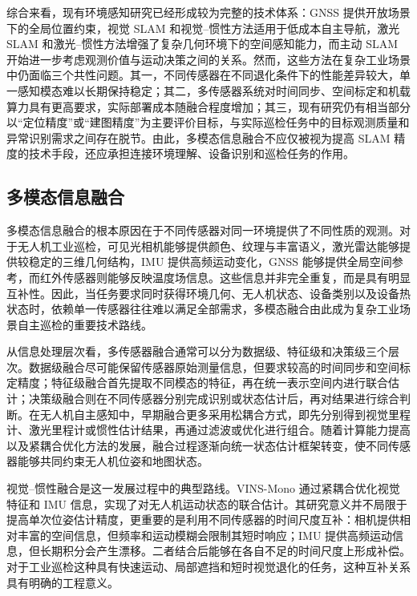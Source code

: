 综合来看，现有环境感知研究已经形成较为完整的技术体系：GNSS 提供开放场景下的全局位置约束，视觉 SLAM 和视觉--惯性方法适用于低成本自主导航，激光 SLAM 和激光--惯性方法增强了复杂几何环境下的空间感知能力，而主动 SLAM 开始进一步考虑观测价值与运动决策之间的关系。然而，这些方法在复杂工业场景中仍面临三个共性问题。其一，不同传感器在不同退化条件下的性能差异较大，单一感知模态难以长期保持稳定；其二，多传感器系统对时间同步、空间标定和机载算力具有更高要求，实际部署成本随融合程度增加；其三，现有研究仍有相当部分以“定位精度”或“建图精度”为主要评价目标，与实际巡检任务中的目标观测质量和异常识别需求之间存在脱节。由此，多模态信息融合不应仅被视为提高 SLAM 精度的技术手段，还应承担连接环境理解、设备识别和巡检任务的作用。

\subsection{多模态信息融合}

多模态信息融合的根本原因在于不同传感器对同一环境提供了不同性质的观测。对于无人机工业巡检，可见光相机能够提供颜色、纹理与丰富语义，激光雷达能够提供较稳定的三维几何结构，IMU 提供高频运动变化，GNSS 能够提供全局空间参考，而红外传感器则能够反映温度场信息\cite{jadin2012recent,usamentiaga2014infrared,wujq2021review}。这些信息并非完全重复，而是具有明显互补性。因此，当任务要求同时获得环境几何、无人机状态、设备类别以及设备热状态时，依赖单一传感器往往难以满足全部需求，多模态融合由此成为复杂工业场景自主巡检的重要技术路线。

从信息处理层次看，多传感器融合通常可以分为数据级、特征级和决策级三个层次。数据级融合尽可能保留传感器原始测量信息，但要求较高的时间同步和空间标定精度；特征级融合首先提取不同模态的特征，再在统一表示空间内进行联合估计；决策级融合则在不同传感器分别完成识别或状态估计后，再对结果进行综合判断\cite{panq2003basic,wangj2004survey,hey2000multi}。在无人机自主感知中，早期融合更多采用松耦合方式，即先分别得到视觉里程计、激光里程计或惯性估计结果，再通过滤波或优化进行组合。随着计算能力提高以及紧耦合优化方法的发展，融合过程逐渐向统一状态估计框架转变，使不同传感器能够共同约束无人机位姿和地图状态。

视觉--惯性融合是这一发展过程中的典型路线。VINS-Mono 通过紧耦合优化视觉特征和 IMU 信息，实现了对无人机运动状态的联合估计\cite{qin2018vins}。其研究意义并不局限于提高单次位姿估计精度，更重要的是利用不同传感器的时间尺度互补：相机提供相对丰富的空间信息，但频率和运动模糊会限制其短时响应；IMU 提供高频运动信息，但长期积分会产生漂移。二者结合后能够在各自不足的时间尺度上形成补偿。对于工业巡检这种具有快速运动、局部遮挡和短时视觉退化的任务，这种互补关系具有明确的工程意义。

